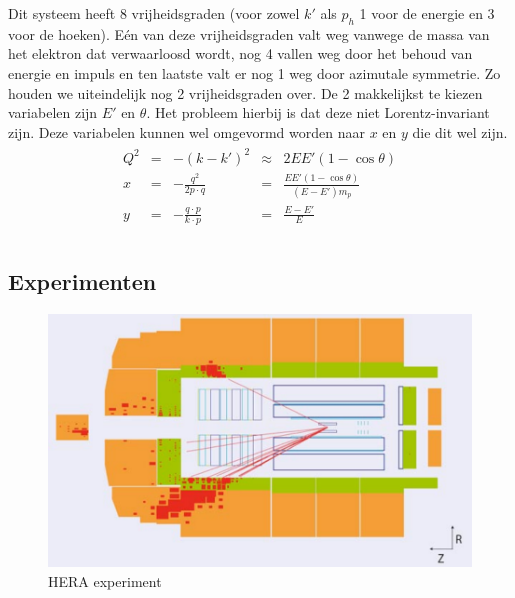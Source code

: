 \documentclass[../main.tex]{subfiles}
\begin{document}
Dit systeem heeft 8 vrijheidsgraden (voor zowel $k'$ als $p_h$ 1 voor de energie en 3 voor de hoeken). Eén van deze vrijheidsgraden valt weg vanwege de massa van het elektron dat verwaarloosd wordt, nog 4 vallen weg door het behoud van energie en impuls en ten laatste valt er nog 1 weg door azimutale symmetrie. Zo houden we uiteindelijk nog 2 vrijheidsgraden over. De 2 makkelijkst te kiezen variabelen zijn $E'$ en $\theta$. Het probleem hierbij is dat deze niet Lorentz-invariant zijn. Deze variabelen kunnen wel omgevormd worden naar $x$ en $y$ die dit wel zijn.
\begin{equation}
    \begin{aligned}
        \label{eq:etheta_naanr_xy}
        \begin{matrix}
            Q^2 & = & -(k-k')^2                 & \approx   & 2EE'(1-\cos\theta) \\
            x   & = & -\frac{q^2}{2p\cdot q}    & =         & \frac{EE'(1-\cos\theta)}{(E-E')m_p} \\
            y   & = & -\frac{q\cdot p}{k\cdot p}& =         & \frac{E-E'}{E} \\
        \end{matrix}
    \end{aligned}
\end{equation}

\subsection{Experimenten}%
\label{sub:experimenten}

\begin{figure}[h]
    \centering
    \includegraphics[width=0.6\linewidth]{DIS_nucleon_structuur_pdf/hera.png}
    \caption{HERA experiment}%
    \label{fig:hera}
\end{figure}
\end{document}
